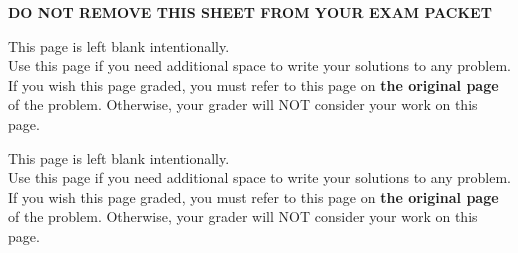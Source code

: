 \documentclass[11pt]{article}
\begin{document}
\begin{enumerate}
\begin{center}
{\bf DO NOT REMOVE THIS SHEET FROM YOUR EXAM PACKET}
\end{center}

\newpage

This page is left blank intentionally.\\

Use this page if you need additional space to write your solutions to any problem. \\

If you wish this page graded, you must refer to this page on \textbf{the original page} of the problem. Otherwise, your grader will NOT consider your work on this page.

\newpage

This page is left blank intentionally.\\

Use this page if you need additional space to write your solutions to any problem. \\

If you wish this page graded, you must refer to this page on \textbf{the original page} of the problem. Otherwise, your grader will NOT consider your work on this page.


\end{enumerate}
\end{document}
